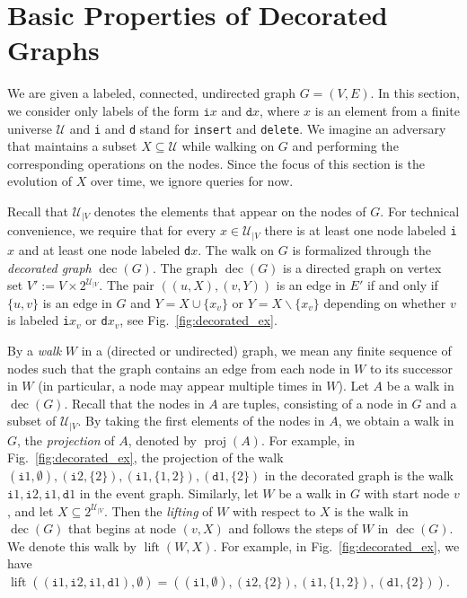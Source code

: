 \documentclass[oribibl,envcountsect,envcountsame]{llncs}
\DeclareMathOperator{\dec}{dec}
\DeclareMathOperator{\pj}{proj}
\DeclareMathOperator{\lt}{lift}
\newcommand{\U}{\mathcal U}
\newcommand{\eqdef}{:=}
\begin{document}
\section{Basic Properties of Decorated Graphs}

We are given a labeled,
connected, undirected graph $G = (V, E)$. In this section, we 
consider only labels of the form $\texttt{i}x$ and $\texttt{d}x$, 
where $x$ is an element from a finite universe $\U$ and \texttt{i} 
and \texttt{d} stand for \texttt{insert} and 
\texttt{delete}. We imagine an adversary that maintains a subset 
$X \subseteq \U$ while walking on $G$ and performing the corresponding operations
on the nodes. Since the focus of this section is the evolution of
$X$ over time, we ignore queries for now.

Recall that $\U_{|V}$  denotes the elements that appear on the nodes of 
$G$.
For technical convenience, we require that for every 
$x \in \U_{|V}$ there is at least one node labeled \texttt{i}$x$ and
at least one node labeled \texttt{d}$x$. The walk on $G$ is
formalized through the \emph{decorated graph} $\dec(G)$. 
The graph $\dec(G)$ is a directed graph on vertex set 
$V' \eqdef V \times 2^{\U_{|V}}$. The pair $((u, X), (v, Y))$ is an 
edge in $E'$ if and only if $\{u, v\}$ is an edge in $G$ 
and $Y = X \cup \{x_v\}$ or 
$Y = X \backslash \{x_v\}$ depending on whether $v$ is labeled 
\texttt{i}$x_v$ or \texttt{d}$x_v$, see Fig.~\ref{fig:decorated_ex}. 

By a \emph{walk} $W$ in a (directed or undirected) graph, we mean any finite 
sequence of nodes such that the graph contains an edge from each node in
$W$ to its successor in $W$ (in particular, a node may appear multiple 
times in $W$).  Let $A$ be a walk in $\dec(G)$. Recall that the 
nodes in $A$ are tuples, consisting of a node in $G$ and a subset 
of $\U_{|V}$. By taking the first elements of the nodes 
in $A$, we obtain a walk in $G$, the \emph{projection} of $A$, denoted 
by $\pj(A)$. For example, in Fig.~\ref{fig:decorated_ex}, the projection
of the walk 
$(\texttt{i}1, \emptyset), (\texttt{i}2, \{2\}), (\texttt{i}1, \{1,2\}),
(\texttt{d}1, \{2\})$ in the decorated graph is the walk
$\texttt{i}1, \texttt{i}2, \texttt{i}1, \texttt{d}1$ in the event graph. 
Similarly, let $W$ be a walk in $G$ with start node 
$v$, and let $X \subseteq 2^{\U_{|V}}$. Then the \emph{lifting} of $W$ with
respect to $X$ is the walk in $\dec(G)$  that begins at node $(v, X)$ and 
follows the steps of $W$ in $\dec(G)$. We denote this walk by
$\lt(W, X)$.
For example, in Fig.~\ref{fig:decorated_ex}, we have
$\lt((\texttt{i}1, \texttt{i}2, \texttt{i}1, \texttt{d}1), \emptyset) = 
((\texttt{i}1, \emptyset), (\texttt{i}2, \{2\}), (\texttt{i}1, \{1,2\}),
(\texttt{d}1, \{2\}))$. 
\end{document}
